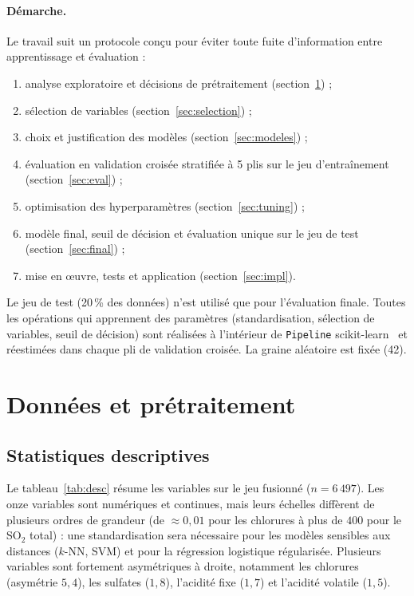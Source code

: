 \documentclass[11pt,a4paper]{article}
\begin{document}
\paragraph{Démarche.}
Le travail suit un protocole conçu pour éviter toute fuite d'information entre apprentissage et évaluation :
\begin{enumerate}
  \item analyse exploratoire et décisions de prétraitement (section~\ref{sec:data}) ;
  \item sélection de variables (section~\ref{sec:selection}) ;
  \item choix et justification des modèles (section~\ref{sec:modeles}) ;
  \item évaluation en validation croisée stratifiée à 5 plis sur le jeu d'entraînement (section~\ref{sec:eval}) ;
  \item optimisation des hyperparamètres (section~\ref{sec:tuning}) ;
  \item modèle final, seuil de décision et évaluation unique sur le jeu de test (section~\ref{sec:final}) ;
  \item mise en œuvre, tests et application (section~\ref{sec:impl}).
\end{enumerate}
Le jeu de test (20\,\% des données) n'est utilisé que pour l'évaluation finale. Toutes les opérations qui apprennent
des paramètres (standardisation, sélection de variables, seuil de décision) sont réalisées à l'intérieur de \texttt{Pipeline} scikit-learn~\cite{sklearn}
et réestimées dans chaque pli de validation croisée. La graine aléatoire est fixée (42).

\section{Données et prétraitement}\label{sec:data}

\subsection{Statistiques descriptives}

Le tableau~\ref{tab:desc} résume les variables sur le jeu fusionné ($n = 6\,497$). Les onze variables sont numériques et continues, mais leurs échelles
diffèrent de plusieurs ordres de grandeur (de $\approx 0{,}01$ pour les chlorures à plus de $400$ pour le SO$_2$ total) : une standardisation sera nécessaire pour les
modèles sensibles aux distances ($k$-NN, SVM) et pour la régression logistique régularisée. Plusieurs variables sont fortement asymétriques à droite,
notamment les chlorures (asymétrie $5{,}4$), les sulfates ($1{,}8$), l'acidité fixe ($1{,}7$) et l'acidité volatile ($1{,}5$).
\end{document}
